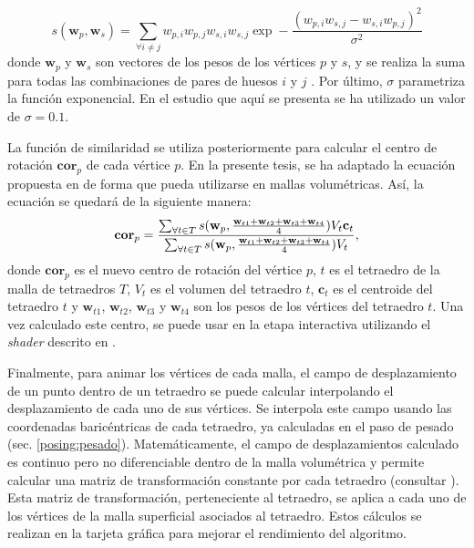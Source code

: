 \begin{equation}
\label{similarity}
 s(\textbf{w}_p,\textbf{w}_s) = 
\sum_{\forall i \neq j} w_{p,i}w_{p,j}w_{s,i}w_{s,j}\exp-\frac{(w_{p,i}w_{s,j}-w_{s,i}w_{p,j})^2}{\sigma^2}
\end{equation}
\normalsize
%
donde $\textbf{w}_p$ y $\textbf{w}_s$ son vectores de los pesos de los vértices $p$ y $s$, y se realiza la suma para todas las combinaciones de pares de huesos $i$ y $j$ . Por último, $\sigma$ parametriza la función exponencial. 
En el estudio que aquí se presenta se ha utilizado un valor de  $\sigma=0.1$. 

La función de similaridad se utiliza posteriormente para calcular el centro de rotación $\textbf{cor}_p$ de cada vértice $p$. En la presente tesis, se ha adaptado la ecuación  propuesta en \cite{le2016real} de forma que pueda utilizarse en mallas volumétricas. Así, la ecuación se quedará de la siguiente manera: 
%
\begin{equation}
\textbf{cor}_p = 
\frac
  {
  \sum_{\forall t \in T}
    s(\textbf{w}_p,
      \frac{\textbf{w}_{t1}+\textbf{w}_{t2}+\textbf{w}_{t3}+\textbf{w}_{t4}}{4})
    V_t\mathbf{c}_t
  }
  {
  \sum_{\forall t \in T}
    s(\textbf{w}_p,
      \frac{\textbf{w}_{t1}+\textbf{w}_{t2}+\textbf{w}_{t3}+\textbf{w}_{t4}}{4})
    V_t
  } ,
\normalsize
\end{equation}
%
donde $\textbf{cor}_p$ es el nuevo centro de rotación del vértice $p$, $t$ es el tetraedro de la malla de tetraedros $T$, $V_t$ es el volumen del tetraedro $t$, $\textbf{c}_t$ es el centroide del tetraedro $t$ y $\textbf{w}_{t1}$, $\textbf{w}_{t2}$, $\textbf{w}_{t3}$ y $\textbf{w}_{t4}$ son los pesos de los vértices del tetraedro $t$. Una vez calculado este centro, se puede usar en la etapa interactiva utilizando el \emph{shader} descrito en \cite{le2016real}.

Finalmente, para animar los vértices de cada malla, el campo de desplazamiento de un punto dentro de un tetraedro se puede calcular interpolando el desplazamiento de cada uno de sus vértices. Se interpola este campo usando las coordenadas baricéntricas de cada tetraedro, ya calculadas en el paso de pesado (sec. \ref{posing:pesado}). Matemáticamente, el campo de desplazamientos calculado es continuo pero no diferenciable dentro de la malla volumétrica y permite calcular una matriz de transformación constante por cada tetraedro (consultar \cite{Muller2004}). Esta matriz de transformación, perteneciente al tetraedro, se aplica a cada uno de los vértices de la malla superficial asociados al tetraedro. Estos cálculos se realizan en la tarjeta gráfica para mejorar el rendimiento del algoritmo.

